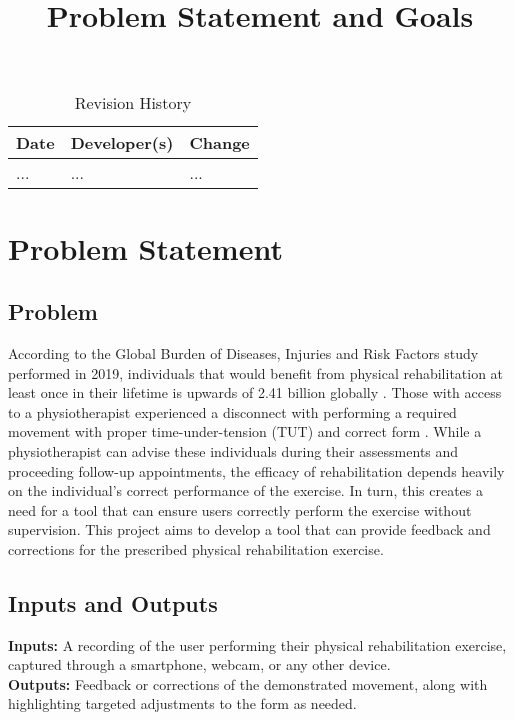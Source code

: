 \documentclass{article}
\title{Problem Statement and Goals\\\progname}
\author{\authname}
\date{}
\begin{document}
\maketitle

\begin{table}[hp]
\caption{Revision History} \label{TblRevisionHistory}
\begin{tabularx}{\textwidth}{llX}
\toprule
\textbf{Date} & \textbf{Developer(s)} & \textbf{Change}\\
\midrule
... & ... & ...\\
\bottomrule
\end{tabularx}
\end{table}

\section{Problem Statement}

\subsection{Problem}

According to the Global Burden of Diseases, Injuries and Risk Factors study performed in 2019, 
individuals that would benefit from physical rehabilitation at least once in their 
lifetime is upwards of 2.41 billion globally \citep{CiezaEtAl2021}.
Those with access to a physiotherapist experienced a 
disconnect with performing a required movement with proper time-under-tension (TUT) and 
correct form \citep{FaberEtAl2015}. While a physiotherapist can advise these individuals
during their assessments and proceeding follow-up appointments, the efficacy of rehabilitation
depends heavily on the individual's correct performance of the exercise. In turn, this creates a need for a tool that can ensure users 
correctly perform the exercise without supervision. This project aims to develop a tool that can 
provide feedback and corrections for the prescribed physical rehabilitation exercise.

\subsection{Inputs and Outputs}

\textbf{Inputs:} A recording of the user performing their physical rehabilitation exercise, captured through a smartphone, webcam, or any other device. \\
\textbf{Outputs:} Feedback or corrections of the demonstrated movement, along with highlighting targeted adjustments to the form as needed. 
\end{document}

